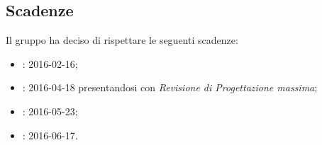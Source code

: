 \subsection{Scadenze}
Il gruppo \gruppo ha deciso di rispettare le seguenti scadenze:
\begin{itemize}
	\item \textbf{\RR}: 2016-02-16;
	\item \textbf{\RP}: 2016-04-18 presentandosi con \textit{Revisione di Progettazione massima};
	\item \textbf{\RQ}: 2016-05-23;
	\item \textbf{\RA}: 2016-06-17.
\end{itemize}

